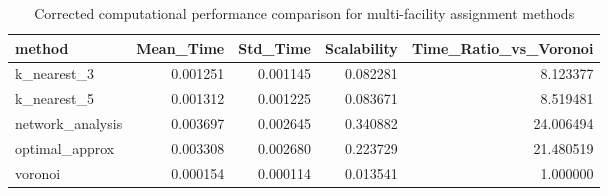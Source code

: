 \begin{table}
\caption{Corrected computational performance comparison for multi-facility assignment methods}
\label{tab:multifacility_performance_corrected}
\begin{tabular}{lrrrr}
\toprule
method & Mean_Time & Std_Time & Scalability & Time_Ratio_vs_Voronoi \\
\midrule
k_nearest_3 & 0.001251 & 0.001145 & 0.082281 & 8.123377 \\
k_nearest_5 & 0.001312 & 0.001225 & 0.083671 & 8.519481 \\
network_analysis & 0.003697 & 0.002645 & 0.340882 & 24.006494 \\
optimal_approx & 0.003308 & 0.002680 & 0.223729 & 21.480519 \\
voronoi & 0.000154 & 0.000114 & 0.013541 & 1.000000 \\
\bottomrule
\end{tabular}
\end{table}
